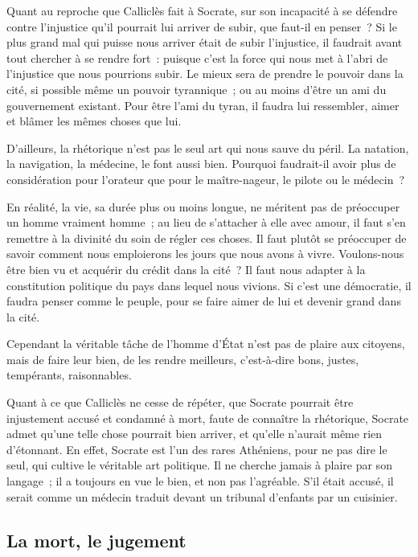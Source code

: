 \documentclass[a5paper,12pt]{article}
\begin{document}
Quant au reproche que Calliclès fait à Socrate, sur son incapacité à se défendre contre l'injustice qu'il pourrait lui arriver de subir, que faut-il en penser~? Si le plus grand mal qui puisse nous arriver était de subir l'injustice, il faudrait avant tout chercher à se rendre fort~: puisque c'est la force qui nous met à l'abri de l'injustice que nous pourrions subir. Le mieux sera de prendre le pouvoir dans la cité, si possible même un pouvoir tyrannique~; ou au moins d'être un ami du gouvernement existant. Pour être l'ami du tyran, il faudra lui ressembler, aimer et blâmer les mêmes choses que lui.

D'ailleurs, la rhétorique n'est pas le seul art qui nous sauve du péril. La natation, la navigation, la médecine, le font aussi bien. Pourquoi faudrait-il avoir plus de considération pour l'orateur que pour le maître-nageur, le pilote ou le médecin~?

En réalité, la vie, sa durée plus ou moins longue, ne méritent pas de préoccuper un homme vraiment homme~; au lieu de s'attacher à elle avec amour, il faut s'en remettre à la divinité du soin de régler ces choses. Il faut plutôt se préoccuper de savoir comment nous emploierons les jours que nous avons à vivre. Voulons-nous être bien vu et acquérir du crédit dans la cité~? Il faut nous adapter à la constitution politique du pays dans lequel nous vivions. Si c'est une démocratie, il faudra penser comme le peuple, pour se faire aimer de lui et devenir grand dans la cité.

Cependant la véritable tâche de l'homme d'État n'est pas de plaire aux citoyens, mais de faire leur bien, de les rendre meilleurs, c'est-à-dire bons, justes, tempérants, raisonnables.

Quant à ce que Calliclès ne cesse de répéter, que Socrate pourrait être injustement accusé et condamné à mort, faute de connaître la rhétorique, Socrate admet qu'une telle chose pourrait bien arriver, et qu'elle n'aurait même rien d'étonnant. En effet, Socrate est l'un des rares Athéniens, pour ne pas dire le seul, qui cultive le véritable art politique. Il ne cherche jamais à plaire par son langage~; il a toujours en vue le bien, et non pas l'agréable. S'il était accusé, il serait comme un médecin traduit devant un tribunal d'enfants par un cuisinier.

\subsection*{La mort, le jugement}
\end{document}
